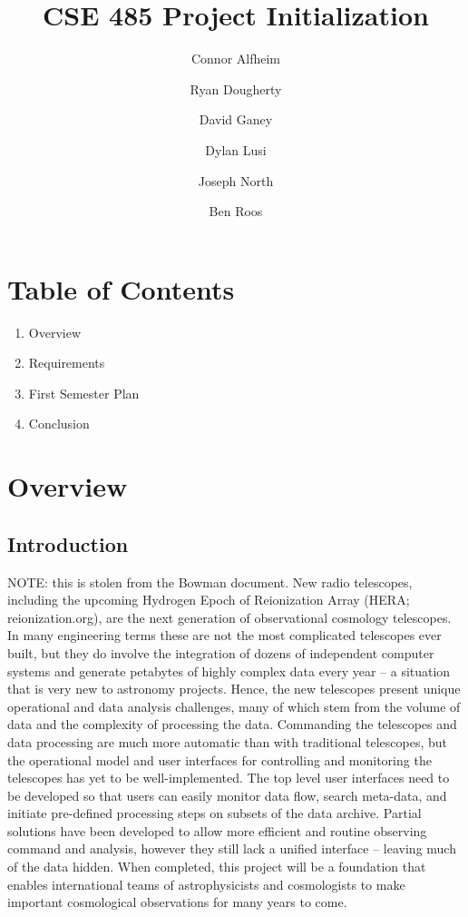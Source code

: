 \documentclass[12pt]{article}
\begin{document}
\begin{spacing}{.4}
\setlength{\droptitle}{-7em}
\title{CSE 485 Project Initialization}
\author{Connor Alfheim \and Ryan Dougherty \and David Ganey \and Dylan Lusi \and Joseph North \and Ben Roos}
\maketitle
\newpage
\end{spacing}

\begin{spacing}{1.5}

\section{Table of Contents}
\begin{enumerate}
\item Overview
\item Requirements
\item First Semester Plan
\item Conclusion
\end{enumerate}
\newpage

\section{Overview}
\subsection{Introduction}
NOTE: this is stolen from the Bowman document.
\newline \newline
New radio telescopes, including the upcoming Hydrogen Epoch of Reionization Array
(HERA; reionization.org), are the next generation of observational cosmology
telescopes. In many engineering terms these are not the most complicated telescopes
ever built, but they do involve the integration of dozens of independent computer
systems and generate petabytes of highly complex data every year – a situation that is
very new to astronomy projects. Hence, the new telescopes present unique
operational and data analysis challenges, many of which stem from the volume of data
and the complexity of processing the data. Commanding the telescopes and data
processing are much more automatic than with traditional telescopes, but the
operational model and user interfaces for controlling and monitoring the telescopes has
yet to be well-implemented. The top level user interfaces need to be developed so that
users can easily monitor data flow, search meta-data, and initiate pre-defined
processing steps on subsets of the data archive. Partial solutions have been developed
to allow more efficient and routine observing command and analysis, however they still
lack a unified interface -- leaving much of the data hidden. When completed, this
project will be a foundation that enables international teams of astrophysicists and
cosmologists to make important cosmological observations for many years to come.


\end{spacing}
\end{document}
